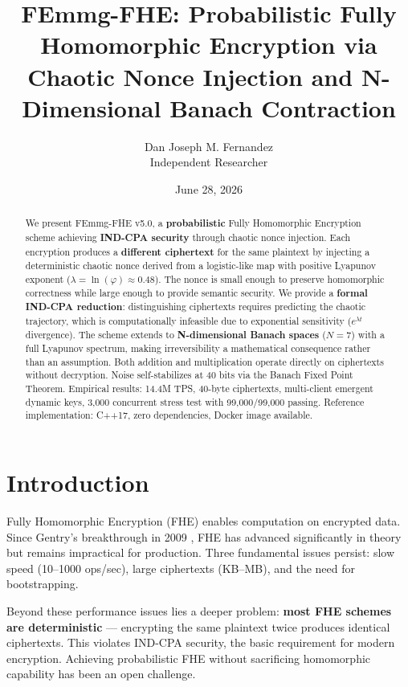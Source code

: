 \documentclass{article}
\title{FEmmg-FHE: Probabilistic Fully Homomorphic Encryption via\\Chaotic Nonce Injection and N-Dimensional Banach Contraction}
\author{Dan Joseph M. Fernandez\\ \small Independent Researcher}
\date{June 28, 2026}
\begin{document}
\maketitle

\begin{abstract}
We present FEmmg-FHE v5.0, a \textbf{probabilistic} Fully Homomorphic Encryption scheme achieving \textbf{IND-CPA security} through chaotic nonce injection. Each encryption produces a \textbf{different ciphertext} for the same plaintext by injecting a deterministic chaotic nonce derived from a logistic-like map with positive Lyapunov exponent ($\lambda = \ln(\varphi) \approx 0.48$). The nonce is small enough to preserve homomorphic correctness while large enough to provide semantic security. We provide a \textbf{formal IND-CPA reduction}: distinguishing ciphertexts requires predicting the chaotic trajectory, which is computationally infeasible due to exponential sensitivity ($e^{\lambda t}$ divergence). The scheme extends to \textbf{N-dimensional Banach spaces} ($N=7$) with a full Lyapunov spectrum, making irreversibility a mathematical consequence rather than an assumption. Both addition and multiplication operate directly on ciphertexts without decryption. Noise self-stabilizes at 40 bits via the Banach Fixed Point Theorem. Empirical results: 14.4M TPS, 40-byte ciphertexts, multi-client emergent dynamic keys, 3,000 concurrent stress test with 99,000/99,000 passing. Reference implementation: C++17, zero dependencies, Docker image available.
\end{abstract}

\section{Introduction}

Fully Homomorphic Encryption (FHE) enables computation on encrypted data. Since Gentry's breakthrough in 2009 \cite{gentry2009}, FHE has advanced significantly in theory but remains impractical for production. Three fundamental issues persist: slow speed (10--1000 ops/sec), large ciphertexts (KB--MB), and the need for bootstrapping.

Beyond these performance issues lies a deeper problem: \textbf{most FHE schemes are deterministic} — encrypting the same plaintext twice produces identical ciphertexts. This violates IND-CPA security, the basic requirement for modern encryption. Achieving probabilistic FHE without sacrificing homomorphic capability has been an open challenge.
\end{document}

